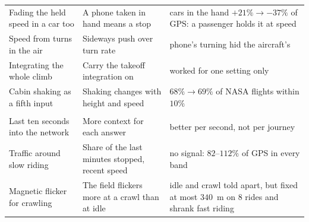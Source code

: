 \begin{tabular}{>{\raggedright\arraybackslash}p{}>{\raggedright\arraybackslash}p{}>{\raggedright\arraybackslash}p{}}
Fading the held speed in a car too & A phone taken in hand means a stop & cars in the hand $+21\% \to -37\%$ of GPS: a passenger holds it at speed\\
Speed from turns in the air & Sideways push over turn rate & phone's turning hid the aircraft's\\
Integrating the whole climb & Carry the takeoff integration on & worked for one setting only\\
Cabin shaking as a fifth input & Shaking changes with height and speed & $68\% \to 69\%$ of NASA flights within $10\%$\\
\midrule
\multicolumn{3}{l}{\emph{Speed}}\\
Last ten seconds into the network & More context for each answer & better per second, not per journey\\
Traffic around slow riding & Share of the last minutes stopped, recent speed & no signal: $82$--$112\%$ of GPS in every band\\
Magnetic flicker for crawling & The field flickers more at a crawl than at idle & idle and crawl told apart, but fixed at most $340$~m on $8$ rides and shrank fast riding\\
\bottomrule
\end{tabular}
